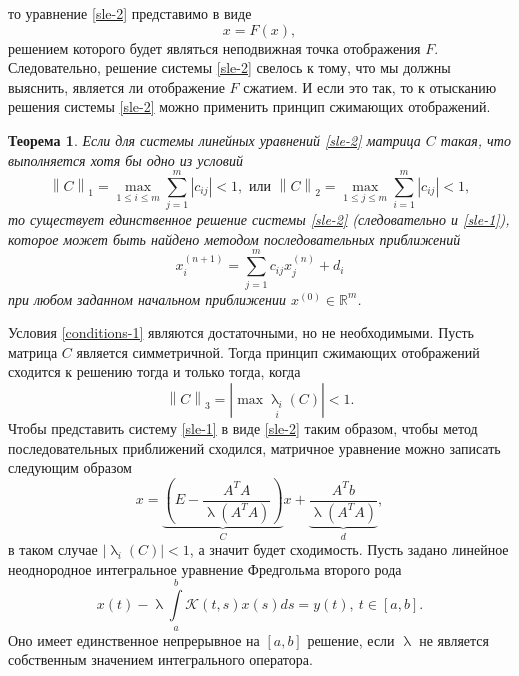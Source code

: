 \documentclass[a4paper, 12pt]{report}
\numberwithin{equation}{section}
\renewcommand{\leq}{\leqslant}
\renewcommand{\lambda}{\uplambda}
\newcommand\Norm[1]{\left\| #1 \right\|}
\newtheorem*{theorem}{Теорема}
\begin{document}
	то уравнение \eqref{sle-2} представимо в виде
	\begin{equation}
		x = F(x),
	\end{equation}
	решением которого будет являться неподвижная точка отображения $F$. Следовательно, решение системы \eqref{sle-2} свелось к тому, что мы должны выяснить, является ли отображение $F$ сжатием. И если это так, то к отысканию решения системы \eqref{sle-2} можно применить принцип сжимающих отображений. 
	\begin{theorem}
		Если для системы линейных уравнений \eqref{sle-2} матрица $C$ такая, что выполняется хотя бы одно из условий
		\begin{equation}
			\label{conditions-1}
			\Norm{C}_1 = \underset{1 \leq i \leq m}{\max} \sum_{j=1}^{m}|c_{ij}| < 1, \text{ или } \Norm{C}_2 = \underset{1 \leq j \leq m}{\max} \sum_{i=1}^{m}|c_{ij}| < 1,
		\end{equation}
		то существует единственное решение системы \eqref{sle-2} (следовательно и \eqref{sle-1}), которое может быть найдено методом последовательных приближений
		\begin{equation}
			x_i ^{(n+1)} = \sum_{j=1}^m c_{ij} x_j ^{(n)} + d_i
		\end{equation}
		при любом заданном начальном приближении $x^{(0)}\in \mathbb R^m$.
	\end{theorem}
	\noindent Условия \eqref{conditions-1} являются достаточными, но не необходимыми. Пусть матрица $C$ является симметричной. Тогда принцип сжимающих отображений сходится к решению тогда и только тогда, когда
	\begin{equation*}
		\Norm{C}_3 = |\underset{i}{\max \lambda _i (C)}| < 1.
	\end{equation*}
	Чтобы представить систему \eqref{sle-1} в виде \eqref{sle-2} таким образом, чтобы метод последовательных приближений сходился, матричное уравнение можно записать следующим образом
	\begin{equation}
		x = \underbrace{\left(E - \dfrac{A^T A}{\lambda(A^T A)} \right)}_{C}x + \underbrace{\dfrac{A^T b}{\lambda (A^T A)}}_{d}, 
	\end{equation}
	в таком случае $|\lambda_i(C)| < 1$, а значит будет сходимость.
	\noindent
	Пусть задано линейное неоднородное интегральное уравнение Фредгольма второго рода
	\begin{equation}
		\label{fie-1}
		x(t) -\lambda\int\limits_a^b \mathcal K(t,s)x(s)ds = y(t),\ t \in [a,b].
	\end{equation}
	Оно имеет единственное непрерывное на $[a,b]$ решение, если $\lambda$ не является собственным значением интегрального оператора.
\end{document}

